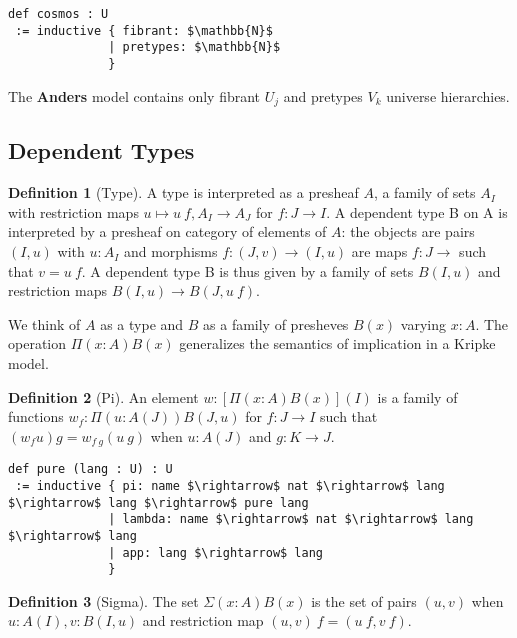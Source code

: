 \documentclass{article}
\theoremstyle{definition}
\newtheorem{definition}{Definition}
\begin{document}
\begin{lstlisting}[mathescape=true]
def cosmos : U
 := inductive { fibrant: $\mathbb{N}$
              | pretypes: $\mathbb{N}$
              }
\end{lstlisting}

The \textbf{Anders} model contains only fibrant $U_j$ and pretypes $V_k$ universe hierarchies.

\newpage

\subsection{Dependent Types}

\begin{definition}[Type]
A type is interpreted as a presheaf $A$, a family of sets $A_I$ with restriction maps
$u \mapsto u\ f, A_I \rightarrow A_J$ for $f: J\rightarrow I$. A dependent type
B on A is interpreted by a presheaf on category of elements of $A$: the objects
are pairs $(I,u)$ with $u : A_I$ and morphisms $f: (J,v) \rightarrow (I,u)$ are
maps $f : J \rightarrow$ such that $v = u\ f$. A dependent type B is thus given
by a family of sets $B(I,u)$ and restriction maps $B(I,u) \rightarrow B(J,u\ f)$.
\end{definition}


We think of $A$ as a type and $B$ as a family of presheves $B(x)$ varying $x:A$.
The operation $\Pi(x:A)B(x)$ generalizes the semantics of
implication in a Kripke model.

\begin{definition}[Pi]
An element $w:[\Pi(x:A)B(x)](I)$ is a family of functions $w_f : \Pi(u:A(J))B(J,u)$
for $f : J \rightarrow I$ such that $(w_f u)g=w_{f\ g}(u\ g)$ when $u:A(J)$ and $g:K\rightarrow J$.
\end{definition}

\begin{lstlisting}[mathescape=true]
def pure (lang : U) : U
 := inductive { pi: name $\rightarrow$ nat $\rightarrow$ lang $\rightarrow$ lang $\rightarrow$ pure lang
              | lambda: name $\rightarrow$ nat $\rightarrow$ lang $\rightarrow$ lang
              | app: lang $\rightarrow$ lang
              }
\end{lstlisting}

\begin{definition}[Sigma]
The set $\Sigma(x:A)B(x)$ is the set of pairs $(u,v)$ when $u:A(I),v:B(I,u)$ and
restriction map $(u,v)\ f=(u\ f,v\ f)$.
\end{definition}
\end{document}
